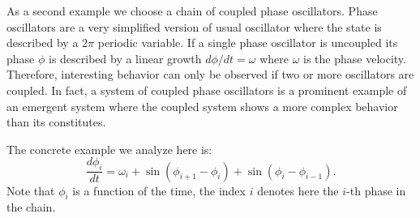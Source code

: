 \documentclass[1p]{elsarticle}
\newcommand {\de} {\mbox{d}}
\newcommand {\rem}[1]{}
\begin{document}
\rem{As a second example we choose a chain of coupled phase oscillators. A
phase oscillator describes the dynamics of an autonomous oscillator
\cite{Pikovsky-Rosenblum,Kuramoto,scholarpedia articles}. Its
evolutions is governed by the phase, a $2\pi$ periodic variable which
grows linearily in time $\de \phi / \de t = \omega$. $\omega$ is here
the phase velocity. Since the absence of any information about the
amplitude of the oscillator interesting behaviour can only be observed
if many of such oscillators are coupled. In fact such system can be
used to study such divergent phenomena like synchronization, wave and
pattern formation, phase chaos, or oscillation death \cite{}. It is a
prominent example of an emergent system where the coupled system shows
more complex behaviour than its constitutes.

The concrete example we analyze here is a chain of nearest-neighbor
coupled phase oscillators:
\begin{equation}
    \frac{\de \phi_i}{\de t} = \omega_i + \sin( \phi_{i+1} - \phi_i) + \sin( \phi_i
    - \phi_{i-1}).
\end{equation}
The index $i$ denotes here the $i$-th phase in the chain. Note, that
the phase velocity might be heterogenous.
}



As a second example we choose a chain of coupled phase oscillators. Phase
oscillators are a very simplified version of usual oscillator where the state
is described by a $2\pi$ periodic variable. If a single phase oscillator is
uncoupled its phase $\phi$ is described by a linear growth $d\phi/dt = \omega$
where $\omega$ is the phase velocity. Therefore, interesting behavior can only
be observed if two or more oscillators are coupled. In fact, a system of
coupled phase oscillators is a prominent example of an emergent system where
the coupled system shows a more complex behavior than its constitutes.

The concrete example we analyze here is:
\begin{equation} \label{eq:phasesystem}
    \frac{d\phi_i}{dt} = \omega_i + \sin( \phi_{i+1} - \phi_i) + \sin( \phi_i
    - \phi_{i-1}).
\end{equation}
Note that $\phi_i$ is a function of the time, the index $i$ denotes here the
$i$-th phase in the chain.
\end{document}
